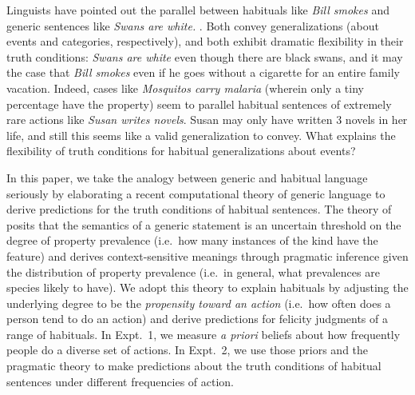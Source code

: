 \documentclass[10pt,letterpaper]{article}
\newcommand{\ndg}[1]{\textcolor{Green}{[ndg: #1]}}
\begin{document}
Linguists have pointed out the parallel between habituals like \emph{Bill smokes} and generic sentences like \emph{Swans are white.} \cite{Carlson1977, Carlson2005, Cohen1999}.
Both convey generalizations (about events and categories, respectively), and both exhibit dramatic flexibility in their truth conditions: \emph{Swans are white} even though there are black swans, and it may the case that \emph{Bill smokes} even if he goes without a cigarette for an entire family vacation.
Indeed, cases like \emph{Mosquitos carry malaria} (wherein only a tiny percentage have the property) seem to parallel habitual sentences of extremely rare actions like \emph{Susan writes novels}. Susan may only have written 3 novels in her life, and
 still this seems like a valid generalization to convey.
What explains the flexibility of truth conditions for habitual generalizations about events?



%

In this paper, we take the analogy between generic and habitual language seriously by elaborating a recent computational theory of generic language to derive predictions for the truth conditions of habitual sentences. 
The theory of  posits that the semantics of a generic statement is an uncertain threshold on the degree of property prevalence (i.e.~how many instances of the kind have the feature) and derives context-sensitive meanings through pragmatic inference given the distribution of property prevalence (i.e.~in general, what prevalences are species likely to have).
We adopt this theory to explain habituals by adjusting the underlying degree to be the \emph{propensity toward an action} (i.e.~how often does a person tend to do an action) and derive predictions for felicity judgments of a range of habituals.
In Expt.~1, we measure \emph{a priori} beliefs about how frequently people do a diverse set of actions.
In Expt.~2, we use those priors and the pragmatic theory to make predictions about the truth conditions of habitual sentences under different frequencies of action. 
\end{document}
